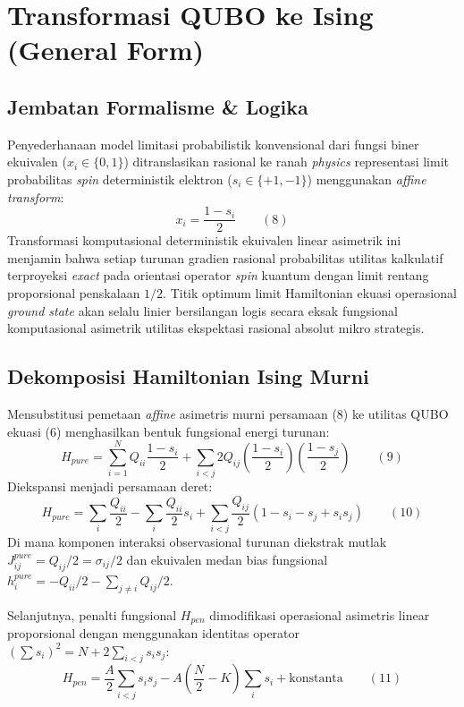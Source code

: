 \hypertarget{transformasi-qubo-ke-ising-general-form}{%
\section{Transformasi QUBO ke Ising (General Form)}\label{transformasi-qubo-ke-ising-general-form}}

\subsection{Jembatan Formalisme \& Logika}
Penyederhanaan model limitasi probabilistik konvensional dari fungsi biner ekuivalen (\(x_i \in \{0, 1\}\)) ditranslasikan rasional ke ranah \emph{physics} representasi limit probabilitas \emph{spin} deterministik elektron (\(s_i \in \{+1, -1\}\)) menggunakan \emph{affine transform}:
\[ x_i = \frac{1 - s_i}{2} \qquad (8) \]
Transformasi komputasional deterministik ekuivalen linear asimetrik ini menjamin bahwa setiap turunan gradien rasional probabilitas utilitas kalkulatif terproyeksi \emph{exact} pada orientasi operator \emph{spin} kuantum dengan limit rentang proporsional penskalaan $1/2$. Titik optimum limit Hamiltonian ekuasi operasional \emph{ground state} akan selalu linier bersilangan logis secara eksak fungsional komputasional asimetrik utilitas ekspektasi rasional absolut mikro strategis.

\subsection{Dekomposisi Hamiltonian Ising Murni}
Mensubstitusi pemetaan \emph{affine} asimetris murni persamaan (8) ke utilitas QUBO ekuasi (6) menghasilkan bentuk fungsional energi turunan:
\[ H_{pure} = \sum_{i=1}^N Q_{ii} \frac{1-s_i}{2} + \sum_{i<j} 2Q_{ij} \left(\frac{1-s_i}{2}\right)\left(\frac{1-s_j}{2}\right) \qquad (9) \]
Diekspansi menjadi persamaan deret:
\[ H_{pure} = \sum_i \frac{Q_{ii}}{2} - \sum_i \frac{Q_{ii}}{2} s_i + \sum_{i<j} \frac{Q_{ij}}{2} (1 - s_i - s_j + s_i s_j) \qquad (10) \]
Di mana komponen interaksi observasional turunan diekstrak mutlak $J_{ij}^{pure} = Q_{ij}/2 = \sigma_{ij}/2$ dan ekuivalen medan bias fungsional $h_i^{pure} = -Q_{ii}/2 - \sum_{j \neq i} Q_{ij}/2$.

Selanjutnya, penalti fungsional $H_{pen}$ dimodifikasi operasional asimetris linear proporsional dengan menggunakan identitas operator \((\sum s_i)^2 = N + 2 \sum_{i<j} s_i s_j\):
\[ H_{pen} = \frac{A}{2} \sum_{i<j}  s_i s_j - A \left( \frac{N}{2} - K \right) \sum_i s_i + \text{konstanta} \qquad (11) \]

